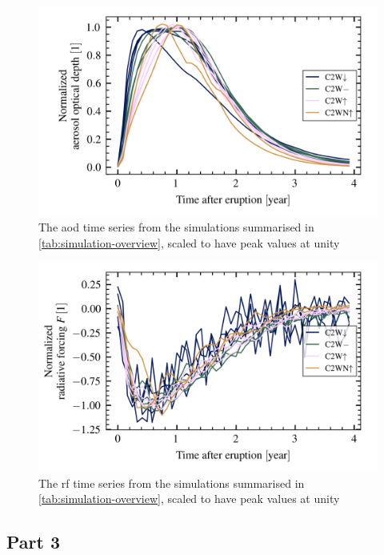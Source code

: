 \documentclass{ametsocV5}
\begin{document}
\begin{figure}[t]
  \begin{center}
    \includegraphics[width=0.95\linewidth]{figures/aod_arrays_normalized.png}
  \end{center}
  \caption{The \ac{aod} time series from the simulations summarised in
    \cref{tab:simulation-overview}, scaled to have peak values at unity}%
  \label{fig:aod_arrays_normalized}
\end{figure}

\begin{figure}[t]
  \begin{center}
    \includegraphics[width=0.95\linewidth]{figures/toa_arrays_normalized.png}
  \end{center}
  \caption{The \ac{rf} time series from the simulations summarised in
    \cref{tab:simulation-overview}, scaled to have peak values at unity}%
  \label{fig:toa_arrays_normalized}
\end{figure}

\subsection{Part 3}
\end{document}

